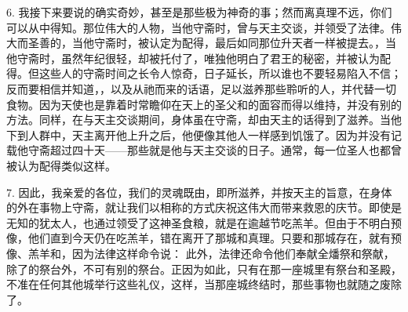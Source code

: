 6. 我接下来要说的确实奇妙，甚至是那些极为神奇的事；然而离真理不远，你们可以从中得知。那位伟大的人物，当他守斋时，曾与天主交谈，并领受了法律。伟大而圣善的，当他守斋时，被认定为配得，最后如同那位升天者一样被提去。，当他守斋时，虽然年纪很轻，却被托付了，唯独他明白了君王的秘密，并被认为配得。但这些人的守斋时间之长令人惊奇，日子延长，所以谁也不要轻易陷入不信；反而要相信并知道，，以及从祂而来的话语，足以滋养那些聆听的人，并代替一切食物。因为天使也是靠着时常瞻仰在天上的圣父和的面容而得以维持，并没有别的方法。同样，在与天主交谈期间，身体虽在守斋，却由天主的话得到了滋养。当他下到人群中，天主离开他上升之后，他便像其他人一样感到饥饿了。因为并没有记载他守斋超过四十天——那些就是他与天主交谈的日子。通常，每一位圣人也都曾被认为配得类似这样。\par

7. 因此，我亲爱的各位，我们的灵魂既由，即所滋养，并按天主的旨意，在身体的外在事物上守斋，就让我们以相称的方式庆祝这伟大而带来救恩的庆节。即使是无知的犹太人，也通过领受了这神圣食粮，就是在逾越节吃羔羊。但由于不明白预像，他们直到今天仍在吃羔羊，错在离开了那城和真理。只要和那城存在，就有预像、羔羊和，因为法律这样命令说： 此外，法律还命令他们奉献全燔祭和祭献，除了的祭台外，不可有别的祭台。正因为如此，只有在那一座城里有祭台和圣殿，不准在任何其他城举行这些礼仪，这样，当那座城终结时，那些事物也就随之废除了。\par

